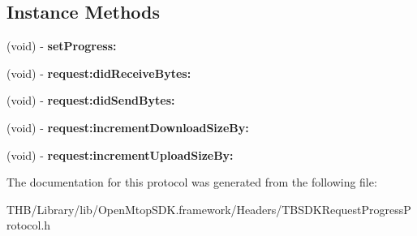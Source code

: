\subsection*{Instance Methods}
\begin{DoxyCompactItemize}
\item 
\mbox{\label{protocol_t_b_s_d_k_request_progress_protocol_01-p_a8e684e6f4c0f5eeea92a779bf7169870}} 
(void) -\/ {\bfseries set\+Progress\+:}
\item 
\mbox{\label{protocol_t_b_s_d_k_request_progress_protocol_01-p_ab13436057b3bf984b77d326b69ca0bf8}} 
(void) -\/ {\bfseries request\+:did\+Receive\+Bytes\+:}
\item 
\mbox{\label{protocol_t_b_s_d_k_request_progress_protocol_01-p_a710d9f1340f2214c15cbcedbe13b2c50}} 
(void) -\/ {\bfseries request\+:did\+Send\+Bytes\+:}
\item 
\mbox{\label{protocol_t_b_s_d_k_request_progress_protocol_01-p_a8f7a539c65e4725324806640c024c787}} 
(void) -\/ {\bfseries request\+:increment\+Download\+Size\+By\+:}
\item 
\mbox{\label{protocol_t_b_s_d_k_request_progress_protocol_01-p_ae6838e589ffada1f964ca5cff027e811}} 
(void) -\/ {\bfseries request\+:increment\+Upload\+Size\+By\+:}
\end{DoxyCompactItemize}


The documentation for this protocol was generated from the following file\+:\begin{DoxyCompactItemize}
\item 
T\+H\+B/\+Library/lib/\+Open\+Mtop\+S\+D\+K.\+framework/\+Headers/T\+B\+S\+D\+K\+Request\+Progress\+Protocol.\+h\end{DoxyCompactItemize}
